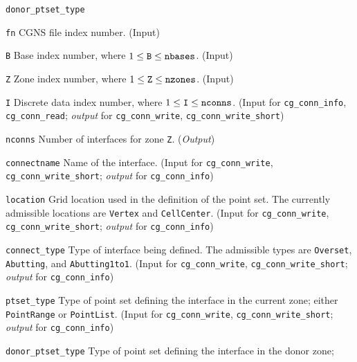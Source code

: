 \begin{Ventryi}{\texttt{donor\_ptset\_type}}\raggedright
\item [\texttt{fn}]
      CGNS file index number.
      (\textcolor{input}{Input})
\item [\texttt{B}]
      Base index number, where $1 \leq \text{\texttt{B}} \leq \text{\texttt{nbases}}$.
      (\textcolor{input}{Input})
\item [\texttt{Z}]
      Zone index number, where $1 \leq \text{\texttt{Z}} \leq \text{\texttt{nzones}}$.
      (\textcolor{input}{Input})
\item [\texttt{I}]
      Discrete data index number, where $1 \leq \text{\texttt{I}} \leq \text{\texttt{nconns}}$.
      (\textcolor{input}{Input} for \texttt{cg\_conn\_info},
      \texttt{cg\_conn\_read};
      \textcolor{output}{\textit{output}} for \texttt{cg\_conn\_write},
      \texttt{cg\_conn\_write\_short})
\item [\texttt{nconns}]
      Number of interfaces for zone \texttt{Z}.
      (\textcolor{output}{\textit{Output}})
\item [\texttt{connectname}]
      Name of the interface.
      (\textcolor{input}{Input} for \texttt{cg\_conn\_write},
      \texttt{cg\_conn\_write\_short};
      \textcolor{output}{\textit{output}} for \texttt{cg\_conn\_info})
\item [\texttt{location}]
      Grid location used in the definition of the point set.
      The currently admissible locations are \texttt{Vertex} and
      \texttt{CellCenter}.
      (\textcolor{input}{Input} for \texttt{cg\_conn\_write},
      \texttt{cg\_conn\_write\_short};
      \textcolor{output}{\textit{output}} for \texttt{cg\_conn\_info})
\item [\texttt{connect\_type}]
      Type of interface being defined.
      The admissible types are \texttt{Overset}, \texttt{Abutting},
      and \texttt{Abutting1to1}.
      (\textcolor{input}{Input} for \texttt{cg\_conn\_write},
      \texttt{cg\_conn\_write\_short};
      \textcolor{output}{\textit{output}} for \texttt{cg\_conn\_info})
\item [\texttt{ptset\_type}]
      Type of point set defining the interface in the current zone;
      either \texttt{PointRange} or \texttt{PointList}.
      (\textcolor{input}{Input} for \texttt{cg\_conn\_write},
      \texttt{cg\_conn\_write\_short};
      \textcolor{output}{\textit{output}} for \texttt{cg\_conn\_info})
\item [\texttt{donor\_ptset\_type}]
      Type of point set defining the interface in the donor zone;

\end{Ventryi}
